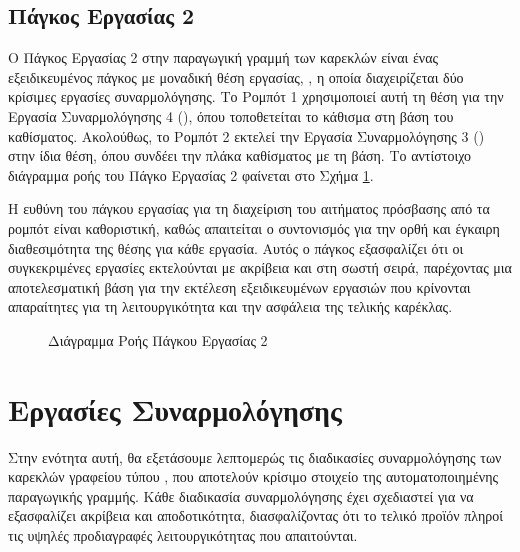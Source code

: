 \subsection{Πάγκος Εργασίας 2}
\noindent Ο Πάγκος Εργασίας 2 στην παραγωγική γραμμή των καρεκλών  είναι ένας εξειδικευμένος πάγκος με μοναδική θέση εργασίας, , η οποία διαχειρίζεται δύο κρίσιμες εργασίες συναρμολόγησης. Το Ρομπότ 1 χρησιμοποιεί αυτή τη θέση για την Εργασία Συναρμολόγησης 4 (), όπου τοποθετείται το κάθισμα στη βάση του καθίσματος. Ακολούθως, το Ρομπότ 2 εκτελεί την Εργασία Συναρμολόγησης 3 () στην ίδια θέση, όπου συνδέει την πλάκα καθίσματος με τη βάση. Το αντίστοιχο διάγραμμα ροής του Πάγκο Εργασίας 2 φαίνεται στο Σχήμα \ref{fig:workbench2_flowchart}.

Η ευθύνη του πάγκου εργασίας για τη διαχείριση του αιτήματος πρόσβασης από τα ρομπότ είναι καθοριστική, καθώς απαιτείται ο συντονισμός για την ορθή και έγκαιρη διαθεσιμότητα της θέσης για κάθε εργασία. Αυτός ο πάγκος εξασφαλίζει ότι οι συγκεκριμένες εργασίες εκτελούνται με ακρίβεια και στη σωστή σειρά, παρέχοντας μια αποτελεσματική βάση για την εκτέλεση εξειδικευμένων εργασιών που κρίνονται απαραίτητες για τη λειτουργικότητα και την ασφάλεια της τελικής καρέκλας.

\begin{figure}[H]
  \centering
  \caption{Διάγραμμα Ροής Πάγκου Εργασίας 2}
  \label{fig:workbench2_flowchart}
\end{figure}

\section{Εργασίες Συναρμολόγησης}
\noindent Στην ενότητα αυτή, θα εξετάσουμε λεπτομερώς τις διαδικασίες συναρμολόγησης των καρεκλών γραφείου τύπου , που αποτελούν κρίσιμο στοιχείο της αυτοματοποιημένης παραγωγικής γραμμής. Κάθε διαδικασία συναρμολόγησης έχει σχεδιαστεί για να εξασφαλίζει ακρίβεια και αποδοτικότητα, διασφαλίζοντας ότι το τελικό προϊόν πληροί τις υψηλές προδιαγραφές λειτουργικότητας που απαιτούνται.

